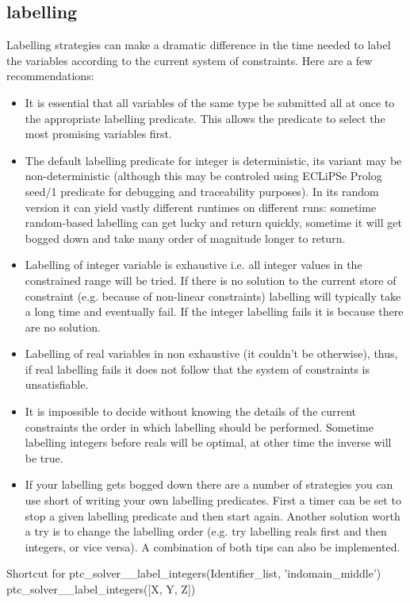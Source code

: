 \documentclass{article}
\begin{document}
\subsection{labelling}
Labelling strategies can make a dramatic difference in the time needed to label
the variables according to the current system of constraints. Here are a few recommendations:
\begin{itemize}
\item It is essential that all variables of the same type be submitted all at
once to the appropriate labelling predicate. This allows the predicate to select
the most promising variables first.
\item The default labelling predicate for integer is deterministic, its variant may be non-deterministic (although this may be controled using ECLiPSe Prolog seed/1 predicate for debugging and traceability purposes).
In its random version it can yield vastly different runtimes on different runs: sometime random-based labelling can get lucky and return
quickly, sometime it will get bogged down and take many order of magnitude longer to return.
\item Labelling of integer variable is exhaustive i.e. all integer values in the
constrained range will be tried. If there is no solution to the current store of
constraint (e.g. because of non-linear constraints) labelling will typically take
a long time and eventually fail. If the integer labelling fails it is because
there are no solution.
\item Labelling of real variables in non exhaustive (it couldn't be otherwise), thus, if
real labelling fails it does not follow that the system of constraints is
unsatisfiable.
\item It is impossible to decide without knowing the details of the current
constraints the order in which labelling should be performed. Sometime labelling
integers before reals will be optimal, at other time the inverse will be true.
\item If your labelling gets bogged down there are a number of strategies you can
use short of writing your own labelling predicates. First a timer can be set to
stop a given labelling predicate and then start again. Another solution worth a
try is to change the labelling order (e.g. try labelling reals first and then
integers, or vice versa). A combination of both tips can also be implemented.
\end{itemize}


    {Shortcut for ptc\_solver\_\_label\_integers(Identifier\_list, 'indomain\_middle')}
    {ptc\_solver\_\_label\_integers([X, Y, Z])}
    {}
\end{document}
